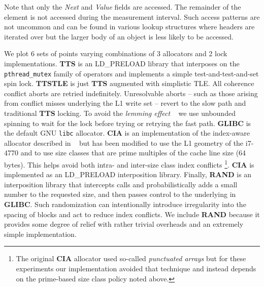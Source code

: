 \documentclass[preprint]{sigplanconf}
\begin{document}
Note that only the \emph{Next} and \emph{Value} fields are
accessed.  The remainder of the element is not accessed during the measurement
interval.  Such access patterns are not 
uncommon and can be found in various lookup structures where headers are iterated
over but the larger body of an object is less likely to be accessed.    

We plot 6 sets of points varying combinations of 3 \malloc{} allocators and 2 lock
implementations.   \textbf{TTS} is an LD\_PRELOAD library that 
interposes on the \texttt{pthread\_mutex} family of operators and implements
a simple test-and-test-and-set spin lock.  \textbf{TTSTLE} is just \textbf{TTS}
augmented with simplistic TLE.  All coherence conflict aborts are retried indefinitely.
Unresolvable aborts -- such as those arising from conflict misses underlying the L1
write set -- revert to the slow path and traditional \textbf{TTS} locking.  To avoid the \emph{lemming effect}
~\cite{SMLI-TR-2009-180} we use unbounded spinning to wait for the lock before
trying or retrying the fast path.  \textbf{GLIBC} is the default GNU \texttt{libc}
\malloc{} allocator. \textbf{CIA} is an implementation of the index-aware
allocator described in ~\cite{ISMM11-Afek-CIA} but has been modified to
use the L1 geometry of the i7-4770 and to 
use size classes that are prime multiples of the cache line size (64 bytes).  
This helps avoid both intra- and inter-size class index conflicts   
\footnote{The original \textbf{CIA} allocator used so-called \emph{punctuated arrays} but
for these experiments our implementation avoided that technique and instead
depends on the prime-based size class policy noted above.}.   
\textbf{CIA} is implemented as an LD\_PRELOAD interposition library.   
Finally, \textbf{RAND} is an interposition library that intercepts \malloc{} calls and
probabilistically adds a small number to the requested size, and then passes 
control to the underlying \malloc{} in \textbf{GLIBC}.  
Such randomization can intentionally introduce irregularity
into the spacing of blocks and act to reduce index conflicts.   We include 
\textbf{RAND} because it provides some degree of relief with rather trivial
overheads and an extremely simple implementation. 
\end{document}
